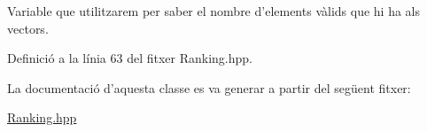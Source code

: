 Variable que utilitzarem per saber el nombre d'elements vàlids que hi ha als vectors. 



Definició a la línia 63 del fitxer Ranking.\-hpp.



La documentació d'aquesta classe es va generar a partir del següent fitxer\-:\begin{DoxyCompactItemize}
\item 
\hyperlink{_ranking_8hpp}{Ranking.\-hpp}\end{DoxyCompactItemize}
